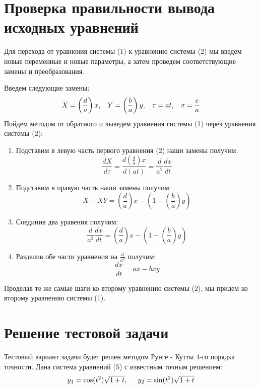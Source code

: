 \documentclass[a4paper,12pt]{article}
\begin{document}
\section{Проверка правильности вывода исходных уравнений}
\hspace{0.5cm} Для перехода от уравнения системы (1) к уравнению системы (2) мы введем новые переменные и новые параметры,
а затем проведем соответствующие замены и преобразования.

Введем следующие замены: 
\begin{equation*}
    X = \left(\frac{d}{a}\right)x, \hspace{0.3cm} Y = \left(\frac{b}{a}\right)y, \hspace{0.3cm} \tau = at, \hspace{0.3cm} \sigma = \frac{c}{a}
\end{equation*}
\hspace{0.5cm} Пойдем методом от обратного и выведем уравнения системы (1) через уравнения системы (2):
\begin{enumerate}
    \item Подставим в левую часть первого уравнения (2) наши замены получим:
    \[ \frac{dX}{d\tau} = \frac{d\left(\frac{d}{a}\right)x}{d(at)} = \frac{d}{a^2} \frac{dx}{dt} \]
    \item Подставим в правую часть наши замены получим: 
    \[ X - XY = \left(\frac{d}{a}\right)x - \left(1 - \left(\frac{b}{a}\right)y\right) \]
    \item Соединив два уравения получим:
    \[ \frac{d}{a^2} \frac{dx}{dt} = \left(\frac{d}{a}\right)x - \left(1 - \left(\frac{b}{a}\right)y\right) \]
    \item Разделив обе части уравнения на $\frac{d}{a^2}$ получим:
    \[ \frac{dx}{dt} = ax - bxy \]
\end{enumerate}

Проделав те же самые шаги ко второму уравнению системы (2), мы придем ко второму уравнению системы (1).

\newpage
\section{Решение тестовой задачи}
\hspace{0.5cm} Тестовый вариант задачи будет решен методом Рунге - Кутты 4-го порядка точности.
Дана система уравнений (5) с известным точным решением:
\begin{equation}
    y_1 = \cos(t^2)\sqrt{1 + t}, \hspace{0.5cm} y_2 = \sin(t^2)\sqrt{1 + t}
\end{equation}
\end{document}
